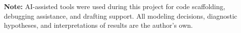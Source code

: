 \documentclass{article}
\begin{document}
\textbf{Note:} AI-assisted tools were used during this project for code
scaffolding, debugging assistance, and drafting support. All modeling
decisions, diagnostic hypotheses, and interpretations of results are the
author's own.

\vfill\pagebreak
{\fontsize{8}{9}\selectfont


}
\end{document}
